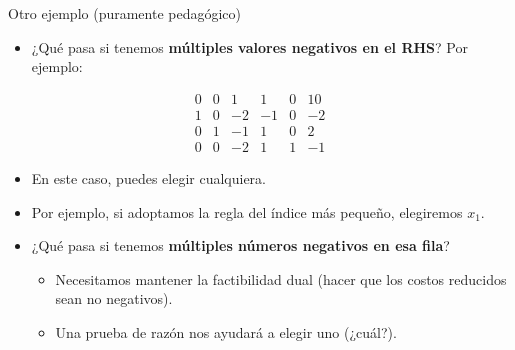 \documentclass{beamer}
\begin{document}
\begin{frame}{Otro ejemplo (puramente pedagógico)}
    \begin{itemize}
        \item ¿Qué pasa si tenemos \textbf{múltiples valores negativos en el RHS}? Por ejemplo:
    \end{itemize}

    \[
    \begin{array}{ccccc|c}
        0 & 0 & 1 & 1 & 0 & 10 \\
        \hline
        1 & 0 & -2 & -1 & 0 & -2 \\
        0 & 1 & -1 & 1 & 0 & 2 \\
        0 & 0 & -2 & 1 & 1 & -1
    \end{array}
    \]

    \begin{itemize}
        \item En este caso, puedes elegir cualquiera.
        \item Por ejemplo, si adoptamos la regla del índice más pequeño, elegiremos \(x_1\).
    \end{itemize}

    \begin{itemize}
        \item ¿Qué pasa si tenemos \textbf{múltiples números negativos en esa fila}?
        \begin{itemize}
            \item Necesitamos mantener la factibilidad dual (hacer que los costos reducidos sean no negativos).
            \item Una prueba de razón nos ayudará a elegir uno (¿cuál?).
        \end{itemize}
    \end{itemize}
\end{frame}
\end{document}
